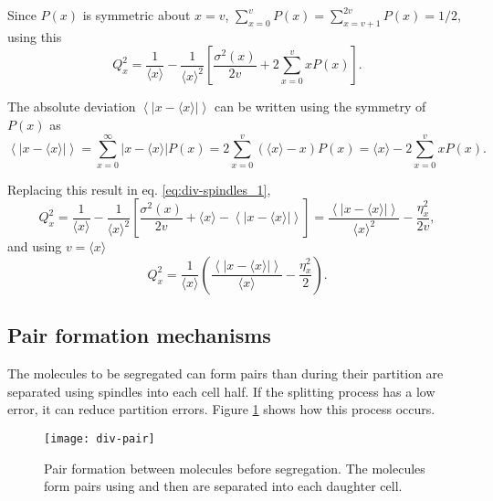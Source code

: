 Since $P(x)$ is symmetric about $x=v$, $\sum_{x=0}^vP(x) = \sum_{x=v+1}^{2v}P(x) = 1/2$, using this
\begin{equation}
  \label{eq:div-spindles_1}
  Q_x^2 = \frac{1}{\langle x\rangle}-\frac{1}{\langle x\rangle^2}\left[\frac{\sigma^2(x)}{2v}+2\sum_{x=0}^vxP(x)\right].
\end{equation}

The absolute deviation $\left\langle\left|x-\langle x\rangle\right|\right\rangle$ can be written using the symmetry of $P(x)$ as
\begin{equation*}
  \left\langle\left|x-\langle x\rangle\right|\right\rangle = \sum_{x=0}^\infty\left|x-\langle x\rangle\right|P(x) = 2\sum_{x=0}^v\left(\langle x\rangle-x\right)P(x) = \langle x\rangle-2\sum_{x=0}^vxP(x).
\end{equation*}

Replacing this result in eq. \eqref{eq:div-spindles_1},
\begin{equation*}
  Q_x^2 = \frac{1}{\langle x\rangle}-\frac{1}{\langle x\rangle^2}\left[\frac{\sigma^2(x)}{2v}+\langle x\rangle-\left\langle\left|x-\langle x\rangle\right|\right\rangle\right] = \frac{\left\langle\left|x-\langle x\rangle\right|\right\rangle}{\langle x\rangle^2}-\frac{\eta_x^2}{2v},
\end{equation*}
and using $v=\langle x\rangle$
\begin{equation*}
  Q_x^2 = \frac{1}{\langle x\rangle}\left(\frac{\left\langle\left|x-\langle x\rangle\right|\right\rangle}{\langle x\rangle}-\frac{\eta_x^2}{2}\right).
\end{equation*}

\subsection{Pair formation mechanisms}

The molecules to be segregated can form pairs than during their partition are separated using spindles into each cell half. If the splitting process has a low error, it can reduce partition errors. Figure \ref{fig:div-pair} shows how this process occurs.
\begin{figure}[H]
  \centering
  \texttt{[image: div-pair]}
  \caption[Pair formation between molecules before segregation]{\label{fig:div-pair}Pair formation between molecules before segregation. The molecules form pairs using and then are separated into each daughter cell.}
\end{figure}

